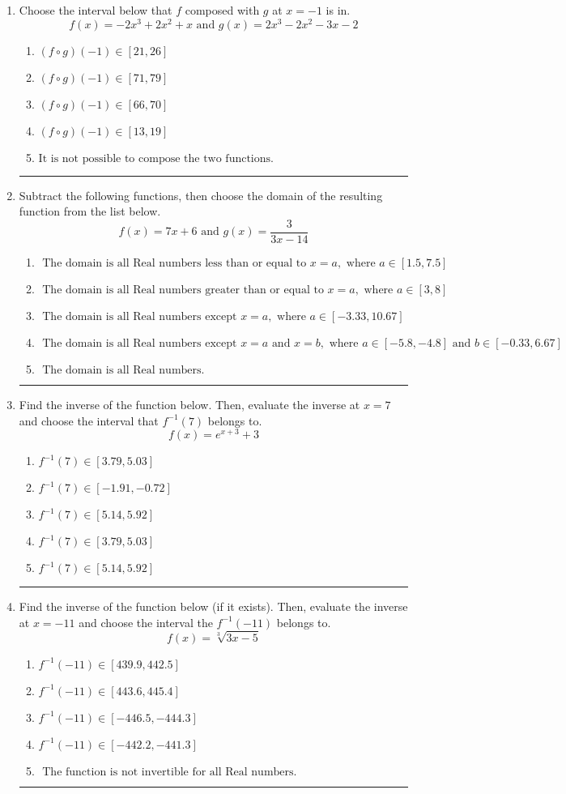 \documentclass[14pt]{extbook}
\newcommand{\litem}[1]{\item#1\hspace*{-1cm}\rule{\textwidth}{0.4pt}}
\begin{document}
\begin{enumerate}
\litem{
Choose the interval below that $f$ composed with $g$ at $x=-1$ is in.\[ f(x) = -2x^{3} +2 x^{2} +x \text{ and } g(x) = 2x^{3} -2 x^{2} -3 x -2 \]\begin{enumerate}[label=\Alph*.]
\item \( (f \circ g)(-1) \in [21, 26] \)
\item \( (f \circ g)(-1) \in [71, 79] \)
\item \( (f \circ g)(-1) \in [66, 70] \)
\item \( (f \circ g)(-1) \in [13, 19] \)
\item \( \text{It is not possible to compose the two functions.} \)

\end{enumerate} }
\litem{
Subtract the following functions, then choose the domain of the resulting function from the list below.\[ f(x) = 7x + 6 \text{ and } g(x) = \frac{3}{3x-14} \]\begin{enumerate}[label=\Alph*.]
\item \( \text{ The domain is all Real numbers less than or equal to } x = a, \text{ where } a \in [1.5, 7.5] \)
\item \( \text{ The domain is all Real numbers greater than or equal to } x = a, \text{ where } a \in [3, 8] \)
\item \( \text{ The domain is all Real numbers except } x = a, \text{ where } a \in [-3.33, 10.67] \)
\item \( \text{ The domain is all Real numbers except } x = a \text{ and } x = b, \text{ where } a \in [-5.8, -4.8] \text{ and } b \in [-0.33, 6.67] \)
\item \( \text{ The domain is all Real numbers. } \)

\end{enumerate} }
\litem{
Find the inverse of the function below. Then, evaluate the inverse at $x = 7$ and choose the interval that $f^{-1}(7)$ belongs to.\[ f(x) = e^{x+3}+3 \]\begin{enumerate}[label=\Alph*.]
\item \( f^{-1}(7) \in [3.79, 5.03] \)
\item \( f^{-1}(7) \in [-1.91, -0.72] \)
\item \( f^{-1}(7) \in [5.14, 5.92] \)
\item \( f^{-1}(7) \in [3.79, 5.03] \)
\item \( f^{-1}(7) \in [5.14, 5.92] \)

\end{enumerate} }
\litem{
Find the inverse of the function below (if it exists). Then, evaluate the inverse at $x = -11$ and choose the interval the $f^{-1}(-11)$ belongs to.\[ f(x) = \sqrt[3]{3 x - 5} \]\begin{enumerate}[label=\Alph*.]
\item \( f^{-1}(-11) \in [439.9, 442.5] \)
\item \( f^{-1}(-11) \in [443.6, 445.4] \)
\item \( f^{-1}(-11) \in [-446.5, -444.3] \)
\item \( f^{-1}(-11) \in [-442.2, -441.3] \)
\item \( \text{ The function is not invertible for all Real numbers. } \)


\end{enumerate}}
\end{enumerate}
\end{document}
